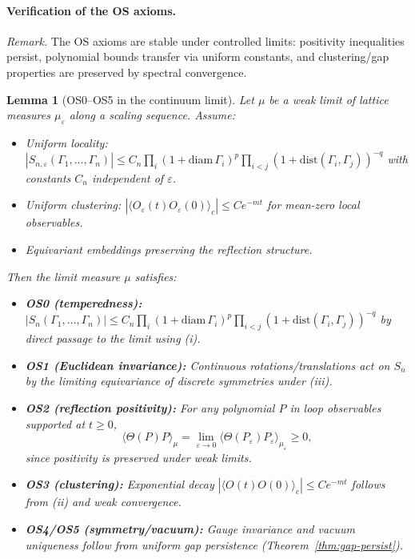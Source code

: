 \documentclass[11pt]{amsart}
\theoremstyle{plain}
\newtheorem{lemma}[theorem]{Lemma}
\theoremstyle{definition}
\theoremstyle{remark}
\begin{document}
\paragraph{Verification of the OS axioms.}
\emph{Remark.} The OS axioms are stable under controlled limits: positivity inequalities persist, polynomial bounds transfer via uniform constants, and clustering/gap properties are preserved by spectral convergence.

\begin{lemma}[OS0--OS5 in the continuum limit]\label{lem:os-continuum}
Let $\mu$ be a weak limit of lattice measures $\mu_\varepsilon$ along a scaling sequence. Assume:
\begin{itemize}
  \item[(i)] Uniform locality: $|S_{n,\varepsilon}(\Gamma_1,\ldots,\Gamma_n)| \le C_n \prod_i (1+\text{diam}\,\Gamma_i)^p \prod_{i<j} (1+\text{dist}(\Gamma_i,\Gamma_j))^{-q}$ with constants $C_n$ independent of $\varepsilon$.
  \item[(ii)] Uniform clustering: $|\langle O_\varepsilon(t) O_\varepsilon(0) \rangle_c| \le C e^{-m t}$ for mean-zero local observables.
  \item[(iii)] Equivariant embeddings preserving the reflection structure.
\end{itemize}
Then the limit measure $\mu$ satisfies:
\begin{itemize}
  \item \textbf{OS0 (temperedness):} $|S_n(\Gamma_1,\ldots,\Gamma_n)| \le C_n \prod_i (1+\text{diam}\,\Gamma_i)^p \prod_{i<j} (1+\text{dist}(\Gamma_i,\Gamma_j))^{-q}$ by direct passage to the limit using (i).
  \item \textbf{OS1 (Euclidean invariance):} Continuous rotations/translations act on $S_n$ by the limiting equivariance of discrete symmetries under (iii).
  \item \textbf{OS2 (reflection positivity):} For any polynomial $P$ in loop observables supported at $t \ge 0$,
  \[
    \langle \Theta(P) P \rangle_\mu = \lim_{\varepsilon \to 0} \langle \Theta(P_\varepsilon) P_\varepsilon \rangle_{\mu_\varepsilon} \ge 0,
  \]
  since positivity is preserved under weak limits.
  \item \textbf{OS3 (clustering):} Exponential decay $|\langle O(t) O(0) \rangle_c| \le C e^{-mt}$ follows from (ii) and weak convergence.
  \item \textbf{OS4/OS5 (symmetry/vacuum):} Gauge invariance and vacuum uniqueness follow from uniform gap persistence (Theorem~\ref{thm:gap-persist}).
\end{itemize}
\end{lemma}
\end{document}
